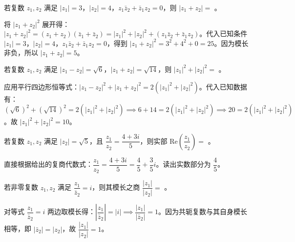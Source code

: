 \documentclass{exam-zh}
\begin{document}
\begin{question}[points=5]
  若复数 $z_1, z_2$ 满足 $|z_1| = 3$，$|z_2| = 4$，$z_1\bar{z}_2 + \bar{z}_1z_2 = 0$，则 $|z_1 + z_2| = $ \fillin。
  \fillin
  \paren[5]
  \begin{solutionblock}
    将 $|z_1 + z_2|^2$ 展开得：$|z_1 + z_2|^2 = (z_1 + z_2)(\bar{z}_1 + \bar{z}_2) = |z_1|^2 + |z_2|^2 + (z_1\bar{z}_2 + \bar{z}_1z_2)$。代入已知条件 $|z_1| = 3$，$|z_2| = 4$，$z_1\bar{z}_2 + \bar{z}_1z_2 = 0$，得到 $|z_1 + z_2|^2 = 3^2 + 4^2 + 0 = 25$。因为模长非负，所以 $|z_1 + z_2| = 5$。
  \end{solutionblock}
\end{question}



\begin{question}[points=5]
  若复数 $z_1, z_2$ 满足 $|z_1 - z_2| = \sqrt{6}$，$|z_1 + z_2| = \sqrt{14}$，则 $|z_1|^2 + |z_2|^2 = $ \fillin。
  \fillin
  \paren[10]
  \begin{solutionblock}
    应用平行四边形恒等式：$|z_1 - z_2|^2 + |z_1 + z_2|^2 = 2(|z_1|^2 + |z_2|^2)$。代入已知数据有：$(\sqrt{6})^2 + (\sqrt{14})^2 = 2(|z_1|^2 + |z_2|^2) \implies 6 + 14 = 2(|z_1|^2 + |z_2|^2) \implies 20 = 2(|z_1|^2 + |z_2|^2)$。故 $|z_1|^2 + |z_2|^2 = 10$。
  \end{solutionblock}
\end{question}



\begin{question}[points=5]
  若复数 $z_1, z_2$ 满足 $|z_2| = \sqrt{5}$，且 $\dfrac{z_1}{z_2} = \dfrac{4+3i}{5}$，则实部 $\mathrm{Re}\left(\dfrac{z_1}{z_2}\right) = $ \fillin。
  \fillin
  \paren[4/5]
  \begin{solutionblock}
    直接根据给出的复商代数式：$\dfrac{z_1}{z_2} = \dfrac{4+3i}{5} = \dfrac{4}{5} + \dfrac{3}{5}i$。读出实数部分为 $\dfrac{4}{5}$。
  \end{solutionblock}
\end{question}



\begin{question}[points=5]
  若非零复数 $z_1, z_2$ 满足 $\dfrac{z_1}{\bar{z}_2} = i$，则其模长之商 $\dfrac{|z_1|}{|z_2|} = $ \fillin。
  \fillin
  \paren[1]
  \begin{solutionblock}
    对等式 $\dfrac{z_1}{\bar{z}_2} = i$ 两边取模长得：$\left|\dfrac{z_1}{\bar{z}_2}\right| = |i| \implies \dfrac{|z_1|}{|\bar{z}_2|} = 1$。因为共轭复数与其自身模长相等，即 $|\bar{z}_2| = |z_2|$，故 $\dfrac{|z_1|}{|z_2|} = 1$。
  \end{solutionblock}
\end{question}
\end{document}
